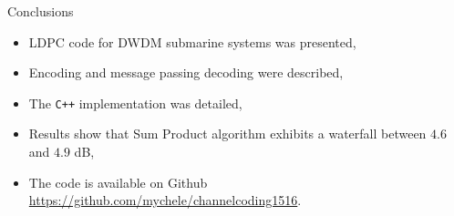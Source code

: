 \documentclass[pdf]
          {beamer}
\begin{document}
\begin{frame}{Conclusions}
    \begin{itemize}
    	\item LDPC code for DWDM submarine systems was presented,
 		\item Encoding and message passing decoding were described,
 		\item The \texttt{C++} implementation was detailed,
 		\item Results show that Sum Product algorithm exhibits a waterfall between $4.6$ and $4.9$ dB,
 		\item The code is available on Github \url{https://github.com/mychele/channelcoding1516}.
	\end{itemize}
\end{frame}
\end{document}

